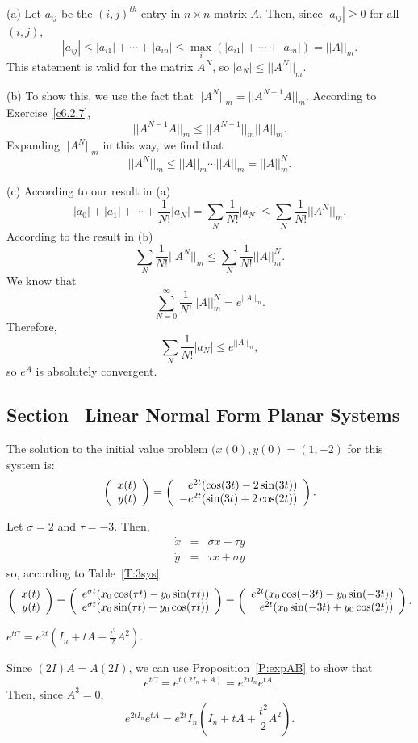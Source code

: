 (a) Let $a_{ij}$ be the $(i,j)^{th}$ entry in $n \times n$ matrix $A$. 
Then, since $|a_{ij}| \geq 0$ for all $(i,j)$,
\[ |a_{ij}| \leq |a_{i1}| + \cdots + |a_{in}| \leq
\max_i(|a_{i1}| + \cdots + |a_{in}|) = ||A||_m. \]
This statement is valid for the matrix $A^N$, so $|a_N| \leq ||A^N||_m$.

(b) To show this, we use the fact that $||A^N||_m = ||A^{N - 1}A||_m$.
According to Exercise~\ref{c6.2.7},
\[
||A^{N - 1}A||_m \leq ||A^{N - 1}||_m ||A||_m.
\]
Expanding $||A^N||_m$ in this way, we find that
\[
||A^N||_m \leq ||A||_m \cdots ||A||_m = ||A||^N_m.
\]

(c) According to our result in (a)
\[ |a_0| + |a_1| + \cdots + \frac{1}{N!}|a_N| = \sum_N
\frac{1}{N!}|a_N| \leq \sum_N \frac{1}{N!}||A^N||_m. \]
According to the result in (b)
\[ \sum_N \frac{1}{N!}||A^N||_m \leq \sum_N \frac{1}{N!}||A||^N_m. \]
We know that
\[ \sum_{N = 0}^{\infty} \frac{1}{N!}||A||^N_m = e^{||A||_m}.  \]
Therefore,
\[ \sum_N \frac{1}{N!}|a_N| \leq e^{||A||_m}, \]
so $e^A$ is absolutely convergent.



\subsection*{Section~\protect{\ref{S:LNFPS}} Linear Normal Form Planar Systems}

\ans The solution to the initial value problem $(x(0),y(0) = (1,-2)$ for
this system is:
\[
\left(\begin{array}{r} x(t) \\ y(t)\end{array}\right) = \left(\begin{array}{r} e^{2t}(\cos(3t) - 2\sin(3t)) \\ -e^{2t}(\sin(3t) + 2\cos(2t))\end{array}\right).
\]

\soln Let $\sigma = 2$ and $\tau = -3$.  Then,
\[
\begin{array}{rrr}
\dot{x} & = & \sigma x - \tau y \\
\dot{y} & = & \tau x + \sigma y \end{array}
\]
so, according to Table~\ref{T:3sys}
\[
\left(\begin{array}{r} x(t) \\ y(t)\end{array}\right) = \left(\begin{array}{r} e^{\sigma t}(x_0\cos(\tau t) -
y_0\sin(\tau t)) \\ e^{\sigma t}(x_0\sin(\tau t) +
y_0\cos(\tau t))\end{array}\right) = \left(\begin{array}{r} e^{2t}(x_0\cos(-3t) - y_0\sin(-3t)) \\ e^{2t}(x_0\sin(-3t) + y_0\cos(2t))\end{array}\right).
\]

\ans $e^{tC} = e^{2t}(I_n + tA + \frac{t^2}{2}A^2)$.

\soln Since $(2I)A = A(2I)$, we can use Proposition~\ref{P:expAB} to
show that
\[
e^{tC} = e^{t(2I_n + A)} = e^{2tI_n}e^{tA}.
\]
Then, since $A^3 = 0$,
\[
e^{2tI_n}e^{tA} = e^{2t}I_n(I_n + tA + \frac{t^2}{2}A^2).
\]



